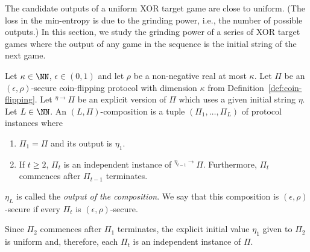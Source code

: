 
The candidate outputs of a uniform XOR target game 
are close to uniform. 
(The loss in the min-entropy is due to the grinding power, 
i.e., the number of possible outputs.) 
In this section, 
we study the grinding power of 
a series of XOR target games where 
the output of any game in the sequence is 
the initial string of the next game.

\newcommand{\ExplicitPi}[1][x]{^{#1 \rightarrow}\Pi}
\begin{definition}[$(L, \Pi)$-composition]
	Let $\kappa \in \NN$, $\epsilon \in (0,1)$ and 
	let $\rho$ be a non-negative real at most $\kappa$.
	Let $\Pi$ be an $(\epsilon, \rho)$-secure coin-flipping protocol 
	with dimension $\kappa$ from Definition~\ref{def:coin-flipping}. 
	Let $\ExplicitPi[\eta]$ be an explicit version of $\Pi$ 
	which uses a given initial string $\eta$.
	Let $L \in \NN$. 
	An $(L, \Pi)$-composition is a tuple $(\Pi_1, \ldots, \Pi_L)$ 
	of protocol instances where
	\begin{enumerate}
		\item $\Pi_1 = \Pi$ and its output is $\eta_1$. 

		\item If $t \geq 2$, 		
			$\Pi_t$ is an independent instance of $\ExplicitPi[\eta_{t-1}]$. 
			Furthermore, $\Pi_t$ commences after $\Pi_{t-1}$ terminates.
		
	\end{enumerate} 
	$\eta_L$ is called the \emph{output of the composition}. 
	We say that this composition is $(\epsilon, \rho)$-secure 
	if every $\Pi_t$ is $(\epsilon, \rho)$-secure.
\end{definition}

Since $\Pi_2$ commences after $\Pi_1$ terminates, 
the explicit initial value $\eta_1$ given to $\Pi_2$ is uniform 
and, therefore, each $\Pi_t$ is an independent instance of $\Pi$.




